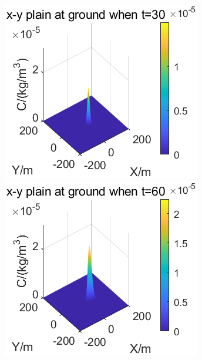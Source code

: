 \documentclass{article}
\begin{document}
	\begin{figure}[htbp]
		\begin{minipage}{0.33\textwidth}
			\includegraphics[width=\textwidth]{pics/g=0.5,t=30.png}
		\end{minipage}
		\begin{minipage}{0.33\textwidth}
			\includegraphics[width=\textwidth]{pics/g=0.5,t=60.png}
		\end{minipage}

\end{figure}
\end{document}
